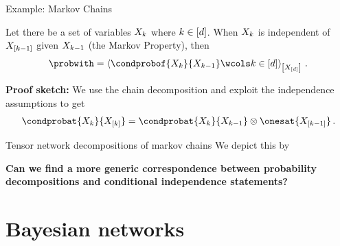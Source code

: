 \documentclass{beamer}
\begin{document}
    \begin{frame}{Example: Markov Chains}

        \begin{theorem}\label{the:MarkovChain}
            Let there be a set of variables $X_{k}$ where $k\in[d]$.
            When $X_{k}$ is independent of $X_{[k-1]}$ given $X_{k-1}$ (the Markov Property), then
            \begin{align*}
                \probwith
                = \contractionof{\condprobof{\catvariableof{\catenumerator}}{\catvariableof{\catenumerator-1}}\wcols \catenumeratorin}{
                    \shortcatvariables
                } \, .
            \end{align*}
        \end{theorem}
            {\bf Proof sketch:} We use the chain decomposition and exploit the independence assumptions to get
        \begin{align*}
            \condprobat{\catvariableof{\catenumerator}}{\catvariableof{[\catenumerator]}}
            = \condprobat{\catvariableof{\catenumerator}}{\catvariableof{\catenumerator-1}} \otimes \onesat{\catvariableof{[\catenumerator-1]}} \, .
        \end{align*}

    \end{frame}

    \begin{frame}{Tensor network decompositions of markov chains}
        We depict this by
        \begin{center}
            
        \end{center}

        \begin{center}
            \bf Can we find a more generic correspondence between probability decompositions and conditional independence statements?
        \end{center}
    \end{frame}


    \section{Bayesian networks}
\end{document}
